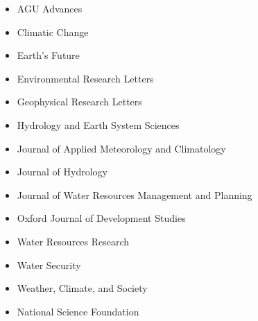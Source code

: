 \documentclass[10pt,oneside]{article}
\begin{document}
\begin{itemize}[label={}]
  
  \item AGU Advances
        
  \item Climatic Change
        
  \item Earth's Future
        
  \item Environmental Research Letters
        
  \item Geophysical Research Letters
        
  \item Hydrology and Earth System Sciences
        
  \item Journal of Applied Meteorology and Climatology
        
  \item Journal of Hydrology
        
  \item Journal of Water Resources Management and Planning
        
  \item Oxford Journal of Development Studies
        
  \item Water Resources Research
        
  \item Water Security
        
  \item Weather, Climate, and Society
        
\end{itemize}



\mbox{}\vspace{-\dimexpr\baselineskip\relax}

\begin{itemize}[label={}]
  
  \item National Science Foundation
        
\end{itemize}

\end{document}
